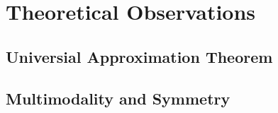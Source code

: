 \documentclass[./\jobname.tex]{subfiles}
\begin{document}
\chapter{Theoretical Observations}

\section{Universial Approximation Theorem}


\section{Multimodality and Symmetry}
\end{document}
